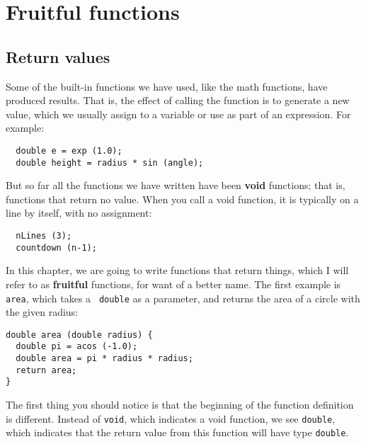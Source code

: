 

\chapter{Fruitful functions}

\section{Return values}

Some of the built-in functions we have used, like the math
functions, have produced results.  That is, the effect of
calling the function is to generate a new value, which we
usually assign to a variable or use as part of an expression.
For example:


\begin{verbatim}
  double e = exp (1.0);
  double height = radius * sin (angle);
\end{verbatim}
%
But so far all the functions we have written have been {\bf void}
functions; that is, functions that return no value.  When you call
a void function, it is typically on a line by itself, with
no assignment:

\begin{verbatim}
  nLines (3);
  countdown (n-1);
\end{verbatim}
%
In this chapter, we are going to write functions that return things,
which I will refer to as {\bf fruitful} functions, for want of a
better name.  The first example is {\tt area}, which takes a {\tt
double} as a parameter, and returns the area of a circle with the
given radius:


\begin{verbatim}
double area (double radius) {
  double pi = acos (-1.0);
  double area = pi * radius * radius;
  return area;
}
\end{verbatim}
%
The first thing you should notice is that the beginning of the
function definition is different.  Instead of {\tt void}, which
indicates a void function, we see {\tt double}, which indicates that
the return value from this function will have type {\tt double}.

